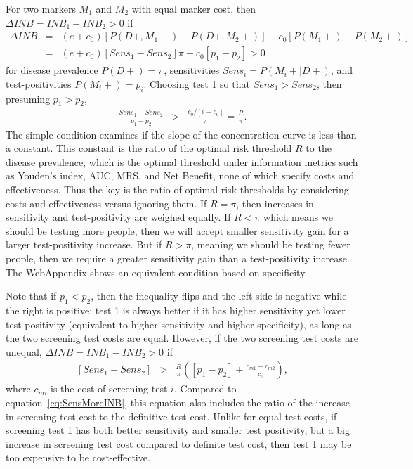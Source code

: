 \documentclass[11pt, letterpaper]{article}
\begin{document}
For two markers $M_1$ and $M_2$ with equal marker cost, then $\Delta INB=INB_1-INB_2>0$ if
\begin{eqnarray*}
	\Delta INB &=& (e+c_0)[P(D+,M_1+)-P(D+,M_2+)] - c_0[P(M_1+)-P(M_2+)]\\
	&=& (e+c_0)[Sens_1-Sens_2]\pi - c_0[p_1-p_2] > 0
\end{eqnarray*}
for disease prevalence $P(D+)=\pi$, sensitivities $Sens_i=P(M_i\!+|D+)$, and test-positivities $P(M_i+)=p_i$.  Choosing test 1 so that $Sens_1>Sens_2$, then presuming $p_1>p_2$,
\begin{eqnarray}
\label{eq:SensMoreINB}
	\frac{Sens_1-Sens_2}{p_1-p_2} &>& \frac{c_0/[e+c_0]}{\pi} = \frac{R}{\pi}.
\end{eqnarray}
The simple condition examines if the slope of the concentration curve is less than a constant.  This constant is the ratio of the optimal risk threshold $R$ to the disease prevalence, which is the optimal threshold under information metrics such as Youden's index, AUC, MRS, and Net Benefit, none of which specify costs and effectiveness.  Thus the key is the ratio of optimal risk thresholds by considering costs and effectiveness versus ignoring them.  If $R=\pi$, then increases in sensitivity and test-positivity are weighed equally.  If $R<\pi$ which means we should be testing more people, then we will accept smaller sensitivity gain for a larger test-positivity increase.  But if $R>\pi$, meaning we should be testing fewer people, then we require a greater sensitivity gain than a test-positivity increase.  The WebAppendix shows an equivalent condition based on specificity. 

Note that if $p_1<p_2$, then the inequality flips and the left side is negative while the right is positive: test 1 is always better if it has higher sensitivity yet lower test-positivity (equivalent to higher sensitivity and higher specificity), as long as the two screening test costs are equal.   However, if the two screening test costs are unequal, $\Delta INB=INB_1-INB_2>0$ if
\begin{eqnarray}
\label{eq:MoreINBunequalCosts}
	[Sens_1-Sens_2]  &>& \frac{R}{\pi} \left( [p_1-p_2] + \frac{c_{m1}-c_{m2}}{c_0} \right),
\end{eqnarray}
where $c_{mi}$ is the cost of screening test $i$.  Compared to equation~\ref{eq:SensMoreINB}, this equation also includes the ratio of the increase in screening test cost to the definitive test cost.  Unlike for equal test costs, if screening test 1 has both better sensitivity and smaller test positivity, but a big increase in screening test cost compared to definite test cost, then test 1 may be too expensive to be cost-effective.  
\end{document}
